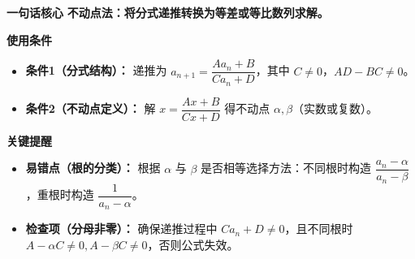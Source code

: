 \begin{summarybox}
	\textbf{\textcolor{CSummary}{一句话核心}}
	\textbf{不动点法：将分式递推转换为等差或等比数列求解。}

	\medskip
	\textbf{\textcolor{CSummary}{使用条件}}
	\begin{itemize}[leftmargin=*, itemsep=0.5em, topsep=0.4em]
		\item \textbf{条件1（分式结构）：} 递推为 $a_{n+1}=\dfrac{Aa_n+B}{Ca_n+D}$，其中 $C\neq0$，$AD-BC\neq0$。
		\item \textbf{条件2（不动点定义）：} 解 $x=\dfrac{Ax+B}{Cx+D}$ 得不动点 $\alpha,\beta$（实数或复数）。
	\end{itemize}

	\medskip
	\textbf{\textcolor{CSummary}{关键提醒}}
	\begin{itemize}[leftmargin=*, itemsep=0.5em, topsep=0.4em]
		\item \textbf{易错点（根的分类）：} 根据 $\alpha$ 与 $\beta$ 是否相等选择方法：不同根时构造 $\dfrac{a_n-\alpha}{a_n-\beta}$，重根时构造 $\dfrac{1}{a_n-\alpha}$。
		\item \textbf{检查项（分母非零）：} 确保递推过程中 $C a_n+D\neq0$，且不同根时 $A-\alpha C\neq0,A-\beta C\neq0$，否则公式失效。
	\end{itemize}

\end{summarybox}
